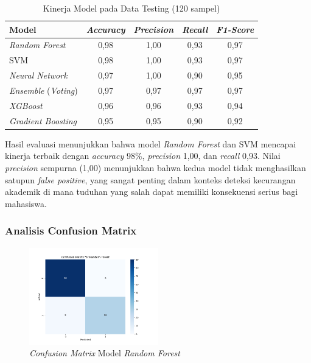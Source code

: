 \begin{table}[htbp]
\centering
\caption{Kinerja Model pada Data Testing (120 sampel)}
\label{tabel:kinerjaModel}
\begin{tabular}{|l|c|c|c|c|}
\hline
\textbf{Model} & \textbf{\textit{Accuracy}} & \textbf{\textit{Precision}} & \textbf{\textit{Recall}} & \textbf{\textit{F1-Score}} \\
\hline
\textit{Random Forest} & 0,98 & 1,00 & 0,93 & 0,97 \\
\hline
SVM & 0,98 & 1,00 & 0,93 & 0,97 \\
\hline
\textit{Neural Network} & 0,97 & 1,00 & 0,90 & 0,95 \\
\hline
\textit{Ensemble} (\textit{Voting}) & 0,97 & 0,97 & 0,97 & 0,97 \\
\hline
\textit{XGBoost} & 0,96 & 0,96 & 0,93 & 0,94 \\
\hline
\textit{Gradient Boosting} & 0,95 & 0,95 & 0,90 & 0,92 \\
\hline
\end{tabular}
\end{table}

Hasil evaluasi menunjukkan bahwa model \textit{Random Forest} dan SVM mencapai kinerja terbaik dengan \textit{accuracy} 98\%, \textit{precision} 1,00, dan \textit{recall} 0,93. Nilai \textit{precision} sempurna (1,00) menunjukkan bahwa kedua model tidak menghasilkan satupun \textit{false positive}, yang sangat penting dalam konteks deteksi kecurangan akademik di mana tuduhan yang salah dapat memiliki konsekuensi serius bagi mahasiswa.

\subsubsection{Analisis Confusion Matrix}

\begin{figure}[htbp]
    \centering
    \includegraphics[width=0.5\textwidth]{figures/confusion_matrix_Random Forest.png}
    \caption{\textit{Confusion Matrix} Model \textit{Random Forest}}
    \label{fig:confusionMatrix}
\end{figure}

